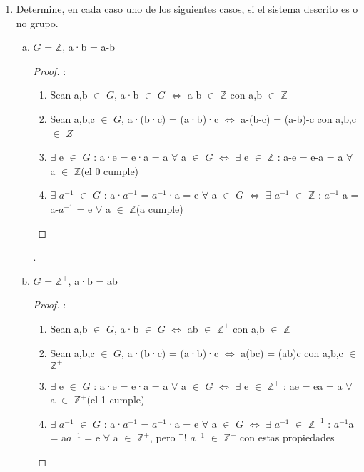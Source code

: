 \documentclass[10pt,a4paper,oneside]{article}
\begin{document}
				\begin{enumerate}[1.]
					\item Determine, en cada caso uno de los siguientes casos, si el sistema descrito es o no grupo.
						\newline
						\begin{enumerate}[a)]
							\item $G$ = $\mathbb{Z}$, a·b = a-b
								\newline
								\begin{proof}:
									\newline
									\begin{enumerate}[1.]
										\item Sean a,b $\in$ $G$, a·b $\in$ $G$ $\iff$ a-b $\in$ $\mathbb{Z}$ con a,b $\in$ $\mathbb{Z}$
										\item Sean a,b,c $\in$ $G$, a·(b·c) = (a·b)·c $\iff$ a-(b-c) = (a-b)-c con a,b,c $\in$ $Z$
										\item $\exists$ e $\in$ $G$ : a·e = e·a = a $\forall$ a $\in$ $G$ $\iff$ $\exists$ e $\in$ $\mathbb{Z}$ : a-e = e-a = a $\forall$ a $\in$ $\mathbb{Z}$(el 0 cumple)
										\item $\exists$ $a^{-1}$ $\in$ $G$ : a·$a^{-1}$ = $a^{-1}$·a = e $\forall$ a $\in$ $G$ $\iff$ $\exists$ $a^{-1}$ $\in$ $\mathbb{Z}$ : $a^{-1}$-a = a-$a^{-1}$ = e $\forall$ a $\in$ $\mathbb{Z}$(a cumple)
									\end{enumerate}
								\end{proof}.
							\newline
							\item $G$ = $\mathbb{Z}^{+}$, a·b = ab
								\newline
								\begin{proof}:
									\newline
									\begin{enumerate}[1.]
										\item Sean a,b $\in$ $G$, a·b $\in$ $G$ $\iff$ ab $\in$ $\mathbb{Z}^{+}$ con a,b $\in$ $\mathbb{Z}^{+}$
										\item Sean a,b,c $\in$ $G$, a·(b·c) = (a·b)·c $\iff$ a(bc) = (ab)c con a,b,c $\in$ $\mathbb{Z}^{+}$
										\item $\exists$ e $\in$ $G$ : a·e = e·a = a $\forall$ a $\in$ $G$ $\iff$ $\exists$ e $\in$ $\mathbb{Z}^{+}$ : ae = ea = a $\forall$ a $\in$ $\mathbb{Z}^{+}$(el 1 cumple)
										\item $\exists$ $a^{-1}$ $\in$ $G$ : a·$a^{-1}$ = $a^{-1}$·a = e $\forall$ a $\in$ $G$ $\iff$ $\exists$ $a^{-1}$ $\in$ $\mathbb{Z}^{-1}$ : $a^{-1}$a = a$a^{-1}$ = e $\forall$ a $\in$ $\mathbb{Z}^{+}$, pero $\exists!$ $a^{-1}$ $\in$ $\mathbb{Z}^{+}$ con estas propiedades

\end{enumerate}
\end{proof}
\end{enumerate}
\end{enumerate}
\end{document}
